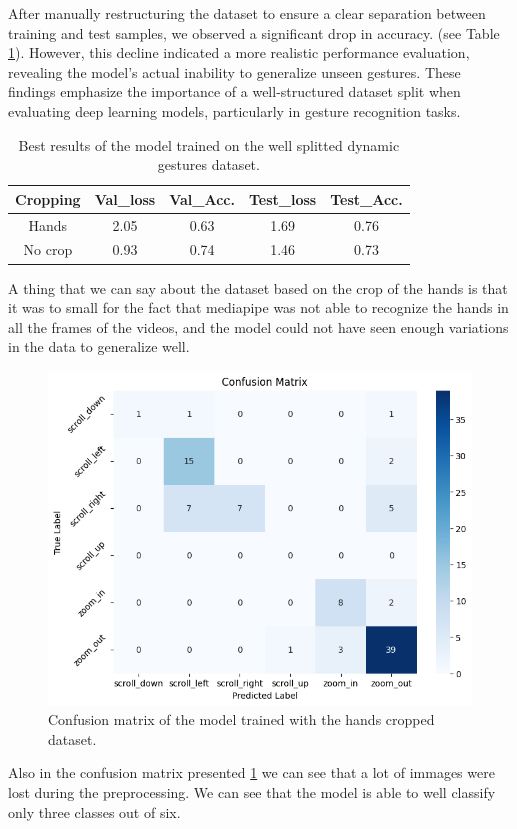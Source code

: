 \documentclass[10pt,twocolumn,letterpaper]{article}
\begin{document}
After manually restructuring the dataset to ensure a clear separation between training and test samples, we observed a significant drop in accuracy. 
(see Table \ref{tab:dynamicGesturesWell}).
However, this decline indicated a more realistic performance evaluation, 
revealing the model's actual inability to generalize unseen gestures.  
These findings emphasize the importance of a well-structured dataset split when evaluating deep 
learning models, particularly in gesture recognition tasks.
\begin{table}[h]
   \begin{center}
   \begin{tabular}{|c|c|c|c|c|}
   \hline
   \textbf{Cropping} & \textbf{Val\_loss} & \textbf{Val\_Acc.} & \textbf{Test\_loss} & \textbf{Test\_Acc.}\\
   \hline\hline
   Hands & 2.05 & 0.63 & 1.69 & 0.76 \\
   No crop & 0.93 & 0.74 & 1.46 & 0.73 \\
   \hline
   \end{tabular}
   \end{center}
   \caption{Best results of the model trained on the well splitted dynamic gestures dataset.}
   \label{tab:dynamicGesturesWell}
\end{table}
A thing that we can say about the dataset based on the crop of the hands is that it was to small for the 
fact that mediapipe was not able to recognize the hands in all the frames of the videos, and the model 
could not have seen enough variations in the data to generalize well. \\
\begin{figure}[h]
   \centering
   \includegraphics[width=1\linewidth]{images/rightDatasetHandsCrop.png}
   \caption{Confusion matrix of the model trained with the hands cropped dataset.}
   \label{fig:handCropConfusionMatrix}
\end{figure}
Also in the confusion matrix presented \ref{fig:handCropConfusionMatrix} we can see that a lot of immages 
were lost during the preprocessing. We can see that the model is able to well classify only three classes out 
of six.
\end{document}
